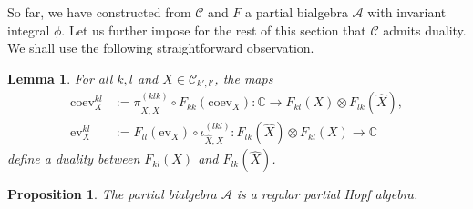 \documentclass[10pt]{article}
\newcommand{\C}{\mathbb{C}}
\newcommand{\CatCC}{\mathscr{C}}
\newcommand{\ev}{\mathrm{ev}}
\newcommand{\coev}{\mathrm{coev}}
\newtheorem{Lem}[Theorem]{Lemma}
\newtheorem{Prop}[Theorem]{Proposition}
\theoremstyle{definition}
\numberwithin{equation}{section}
\begin{document}
So far, we have constructed from $\CatCC$ and $F$ a partial bialgebra
$\mathscr{A}$ with invariant integral $\phi$. Let us further impose
for the rest of this section that $\CatCC$ admits duality.  We shall
use the following straightforward observation.
\begin{Lem}
  For all $k,l$ and $X\in \mathcal{C}_{k',l'}$,  the maps
  \begin{align*}
    \coev^{kl}_{X}  &:=  \pi^{(klk)}_{X,\hat X} \circ F_{kk}(\coev_{X})\colon \C \to F_{kl}(X)
    \otimes F_{lk}(\hat X), \\
    \ev^{kl}_{X} &:=  F_{ll}(\ev_{X}) \circ \iota^{(lkl)}_{\hat X,X} \colon
    F_{lk}(\hat X) \otimes F_{kl}(X) \to \C
  \end{align*}
  define a duality between $F_{kl}(X)$ and $F_{lk}(\hat X)$.
\end{Lem}


\begin{Prop}\label{PropAnti} The partial bialgebra $\mathscr{A}$ is a regular partial Hopf algebra.
\end{Prop} 
\end{document}

